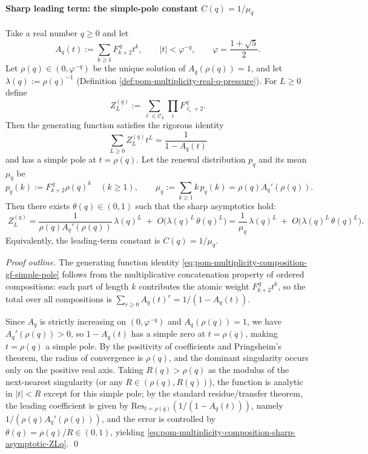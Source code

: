 \paragraph{Sharp leading term: the simple-pole constant \texorpdfstring{$C(q)=1/\mu_q$}{C(q)=1/mu\_q}}
\begin{proposition}\label{prop:pom-multiplicity-composition-sharp-main-term-constant}
Take a real number \(q\ge 0\) and let
\[
A_q(t):=\sum_{k\ge 1}F_{k+2}^{\,q}t^k,\qquad |t|<\varphi^{-q},
\qquad \varphi=\frac{1+\sqrt5}{2}.
\]
Let \(\rho(q)\in(0,\varphi^{-q})\) be the unique solution of \(A_q(\rho(q))=1\), and let \(\lambda(q):=\rho(q)^{-1}\) (Definition \ref{def:pom-multiplicity-real-q-pressure}).
For \(L\ge 0\) define
\[
Z_L^{(q)}:=\sum_{\boldsymbol{\ell}\in\mathcal{C}_L}\prod_i F_{\ell_i+2}^{\,q}.
\]
Then the generating function satisfies the rigorous identity
\begin{equation}\label{eq:pom-multiplicity-composition-gf-simple-pole}
\boxed{\;
\sum_{L\ge 0}Z_L^{(q)}t^L=\frac{1}{1-A_q(t)}\;}
\end{equation}
and has a simple pole at \(t=\rho(q)\).
Let the renewal distribution \(p_q\) and its mean \(\mu_q\) be
\[
p_q(k):=F_{k+2}^{\,q}\rho(q)^k\quad(k\ge 1),
\qquad
\mu_q:=\sum_{k\ge 1}k\,p_q(k)=\rho(q)A_q'(\rho(q)).
\]
Then there exists \(\theta(q)\in(0,1)\) such that the sharp asymptotics hold:
\begin{equation}\label{eq:pom-multiplicity-composition-sharp-asymptotic-ZLq}
\boxed{\;
Z_L^{(q)}=\frac{1}{\rho(q)A_q'(\rho(q))}\,\lambda(q)^{L}\;+\;O\!\bigl(\lambda(q)^L\,\theta(q)^{L}\bigr)
=\frac{1}{\mu_q}\,\lambda(q)^{L}\;+\;O\!\bigl(\lambda(q)^L\,\theta(q)^{L}\bigr).}
\end{equation}
Equivalently, the leading-term constant is \(C(q)=1/\mu_q\).
\end{proposition}
\begin{proof}[Proof outline]
The generating function identity \eqref{eq:pom-multiplicity-composition-gf-simple-pole} follows from the multiplicative concatenation property of ordered compositions: each part of length \(k\) contributes the atomic weight \(F_{k+2}^{\,q}t^k\), so the total over all compositions is \(\sum_{r\ge 0}A_q(t)^r=1/(1-A_q(t))\).
\par
Since \(A_q\) is strictly increasing on \((0,\varphi^{-q})\) and \(A_q(\rho(q))=1\), we have \(A_q'(\rho(q))>0\), so \(1-A_q(t)\) has a simple zero at \(t=\rho(q)\), making \(t=\rho(q)\) a simple pole.
By the positivity of coefficients and Pringsheim's theorem, the radius of convergence is \(\rho(q)\), and the dominant singularity occurs only on the positive real axis.
Taking \(R(q)>\rho(q)\) as the modulus of the next-nearest singularity (or any \(R\in(\rho(q),R(q))\)), the function is analytic in \(|t|<R\) except for this simple pole;
by the standard residue/transfer theorem, the leading coefficient is given by \(\mathrm{Res}_{t=\rho(q)}(1/(1-A_q(t)))\), namely
\(
1/(\rho(q)A_q'(\rho(q)))
\),
and the error is controlled by \(\theta(q)=\rho(q)/R\in(0,1)\), yielding \eqref{eq:pom-multiplicity-composition-sharp-asymptotic-ZLq}. \qed
\end{proof}

